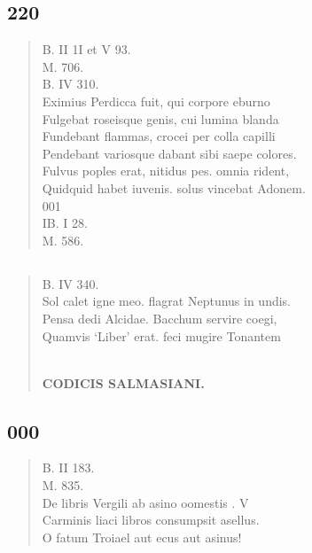 \documentclass[11pt, a4paper]{report}
\begin{document}
            \subsection*{220}
      \begin{verse}
      B. II 1I et V 93. \\ M. 706. \\ B. IV 310. \\ Eximius Perdicca fuit, qui corpore eburno \\ Fulgebat roseisque genis, cui lumina blanda \\ Fundebant flammas, crocei per colla capilli \\ Pendebant variosque dabant sibi saepe colores. \\ Fulvus poples erat, nitidus pes. omnia rident, \\ Quidquid habet iuvenis. solus vincebat Adonem. \\ 001 \\ IB. I 28. \\ M. 586. \\ 
      \end{verse}
  
            \subsection*{}
      \begin{verse}
      B. IV 340. \\ Sol calet igne meo. flagrat Neptunus in undis. \\ Pensa dedi Alcidae. Bacchum servire coegi, \\ Quamvis ‘Liber’ erat.  \lbrack feci mugire Tonantem \rbrack  \\ 
        ﻿\pagebreak 
    \begin{center} \textbf{CODICIS SALMASIANI.} \end{center} \marginpar{[187]} 
      \end{verse}
  
            \subsection*{000}
      \begin{verse}
      B. II 183. \\ M. 835. \\ De libris Vergili ab asino oomestis . V \\ Carminis liaci libros consumpsit asellus. \\ O fatum Troiael aut ecus aut asinus! \\ 
      \end{verse}
  
\end{document}
